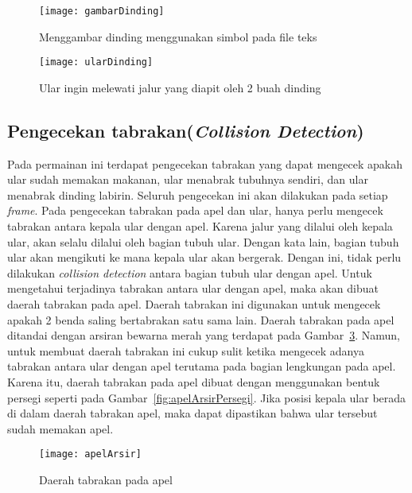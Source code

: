 \begin{figure}[H]
	\centering  
	\texttt{[image: gambarDinding]}  
	\caption[Menggambar dinding menggunakan simbol pada file teks]{Menggambar dinding menggunakan simbol pada file teks}
	\label{fig:gambarDinding} 
\end{figure}

\begin{figure}[H]
	\centering  
	\texttt{[image: ularDinding]}  
	\caption[Ular ingin melewati jalur yang diapit oleh 2 buah dinding]{Ular ingin melewati jalur yang diapit oleh 2 buah dinding}
	\label{fig:ularDinding} 
\end{figure}

\subsection{Pengecekan tabrakan(\textit{Collision Detection})}
Pada permainan ini terdapat pengecekan tabrakan yang dapat mengecek apakah ular sudah memakan makanan, ular menabrak tubuhnya sendiri, dan ular menabrak dinding labirin. Seluruh pengecekan ini akan dilakukan pada setiap \textit{frame}. Pada pengecekan tabrakan pada apel dan ular, hanya perlu mengecek tabrakan antara kepala ular dengan apel. Karena jalur yang dilalui oleh kepala ular, akan selalu dilalui oleh bagian tubuh ular. Dengan kata lain, bagian tubuh ular akan mengikuti ke mana kepala ular akan bergerak. Dengan ini, tidak perlu dilakukan \textit{collision detection} antara bagian tubuh ular dengan apel. Untuk mengetahui terjadinya tabrakan antara ular dengan apel, maka akan dibuat daerah tabrakan pada apel. Daerah tabrakan ini digunakan untuk mengecek apakah 2 benda saling bertabrakan satu sama lain. Daerah tabrakan pada apel ditandai dengan arsiran bewarna merah yang terdapat pada Gambar~\ref{fig:apelArsir}. Namun, untuk membuat daerah tabrakan ini cukup sulit ketika mengecek adanya tabrakan antara ular dengan apel terutama pada bagian lengkungan pada apel. Karena itu, daerah tabrakan pada apel dibuat dengan menggunakan bentuk persegi seperti pada Gambar~\ref{fig:apelArsirPersegi}. Jika posisi kepala ular berada di dalam daerah tabrakan apel, maka dapat dipastikan bahwa ular tersebut sudah memakan apel.\\

\begin{figure}[H]
	\centering  
	\texttt{[image: apelArsir]}  
	\caption[Daerah tabrakan pada apel]{Daerah tabrakan pada apel}
	\label{fig:apelArsir} 
\end{figure}

